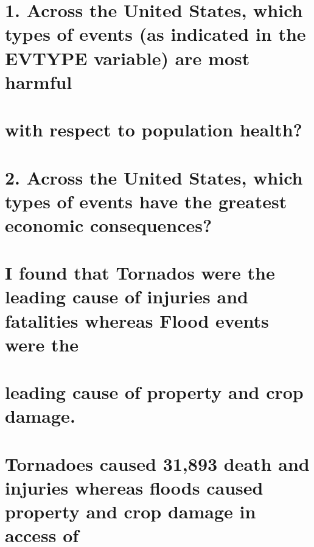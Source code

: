 \documentclass[]{article}
\begin{document}
\hypertarget{across-the-united-states-which-types-of-events-as-indicated-in-the-evtype-variable-are-most-harmful}{%
\section{1. Across the United States, which types of events (as
indicated in the EVTYPE variable) are most
harmful}\label{across-the-united-states-which-types-of-events-as-indicated-in-the-evtype-variable-are-most-harmful}}

\hypertarget{with-respect-to-population-health}{%
\section{with respect to population
health?}\label{with-respect-to-population-health}}

\hypertarget{across-the-united-states-which-types-of-events-have-the-greatest-economic-consequences}{%
\section{2. Across the United States, which types of events have the
greatest economic
consequences?}\label{across-the-united-states-which-types-of-events-have-the-greatest-economic-consequences}}

\hypertarget{i-found-that-tornados-were-the-leading-cause-of-injuries-and-fatalities-whereas-flood-events-were-the}{%
\section{I found that Tornados were the leading cause of injuries and
fatalities whereas Flood events were
the}\label{i-found-that-tornados-were-the-leading-cause-of-injuries-and-fatalities-whereas-flood-events-were-the}}

\hypertarget{leading-cause-of-property-and-crop-damage.}{%
\section{leading cause of property and crop
damage.}\label{leading-cause-of-property-and-crop-damage.}}

\hypertarget{tornadoes-caused-31893-death-and-injuries-whereas-floods-caused-property-and-crop-damage-in-access-of}{%
\section{Tornadoes caused 31,893 death and injuries whereas floods
caused property and crop damage in access
of}\label{tornadoes-caused-31893-death-and-injuries-whereas-floods-caused-property-and-crop-damage-in-access-of}}
\end{document}
